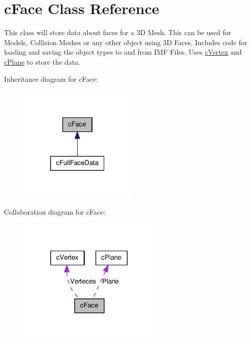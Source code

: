 \hypertarget{classc_face}{
\section{cFace Class Reference}
\label{classc_face}
}


This class will store data about faces for a 3D Mesh. This can be used for Models, Collision Meshes or any other object using 3D Faces. Includes code for loading and saving the object types to and from IMF Files. Uses \hyperlink{classc_vertex}{cVertex} and \hyperlink{classc_plane}{cPlane} to store the data.  




Inheritance diagram for cFace:
\nopagebreak
\begin{figure}[H]
\begin{center}
\leavevmode
\includegraphics[width=160pt]{classc_face__inherit__graph}
\end{center}
\end{figure}


Collaboration diagram for cFace:
\nopagebreak
\begin{figure}[H]
\begin{center}
\leavevmode
\includegraphics[width=194pt]{classc_face__coll__graph}
\end{center}
\end{figure}

